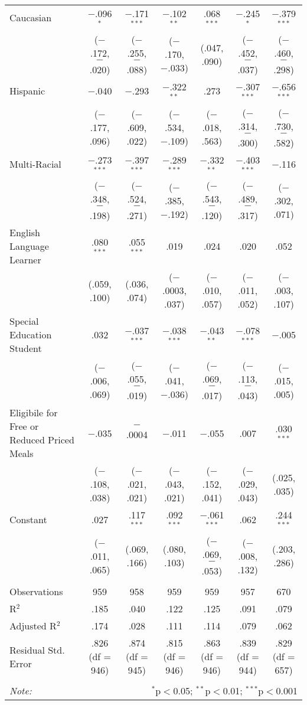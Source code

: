 \begin{table}[!htbp]
\begin{tabular}{@{\extracolsep{5pt}}lcccccc}
  Caucasian & $-$.096$^{*}$ & $-$.171$^{***}$ & $-$.102$^{**}$ & .068$^{***}$ & $-$.245$^{*}$ & $-$.379$^{***}$ \\ 
  & ($-$.172, $-$.020) & ($-$.255, $-$.088) & ($-$.170, $-$.033) & (.047, .090) & ($-$.452, $-$.037) & ($-$.460, $-$.298) \\ 
  Hispanic & $-$.040 & $-$.293 & $-$.322$^{**}$ & .273 & $-$.307$^{***}$ & $-$.656$^{***}$ \\ 
  & ($-$.177, .096) & ($-$.609, .022) & ($-$.534, $-$.109) & ($-$.018, .563) & ($-$.314, $-$.300) & ($-$.730, $-$.582) \\ 
  Multi-Racial & $-$.273$^{***}$ & $-$.397$^{***}$ & $-$.289$^{***}$ & $-$.332$^{**}$ & $-$.403$^{***}$ & $-$.116 \\ 
  & ($-$.348, $-$.198) & ($-$.524, $-$.271) & ($-$.385, $-$.192) & ($-$.543, $-$.120) & ($-$.489, $-$.317) & ($-$.302, .071) \\ 
  English Language Learner & .080$^{***}$ & .055$^{***}$ & .019 & .024 & .020 & .052 \\ 
  & (.059, .100) & (.036, .074) & ($-$.0003, .037) & ($-$.010, .057) & ($-$.011, .052) & ($-$.003, .107) \\ 
  Special Education Student & .032 & $-$.037$^{***}$ & $-$.038$^{***}$ & $-$.043$^{**}$ & $-$.078$^{***}$ & $-$.005 \\ 
  & ($-$.006, .069) & ($-$.055, $-$.019) & ($-$.041, $-$.036) & ($-$.069, $-$.017) & ($-$.113, $-$.043) & ($-$.015, .005) \\ 
  Eligibile for Free or Reduced Priced Meals & $-$.035 & $-$.0004 & $-$.011 & $-$.055 & .007 & .030$^{***}$ \\ 
  & ($-$.108, .038) & ($-$.021, .021) & ($-$.043, .021) & ($-$.152, .041) & ($-$.029, .043) & (.025, .035) \\ 
  Constant & .027 & .117$^{***}$ & .092$^{***}$ & $-$.061$^{***}$ & .062 & .244$^{***}$ \\ 
  & ($-$.011, .065) & (.069, .166) & (.080, .103) & ($-$.069, $-$.053) & ($-$.008, .132) & (.203, .286) \\ 
 \hline \\[-1.8ex] 
Observations & 959 & 958 & 959 & 959 & 957 & 670 \\ 
R$^{2}$ & .185 & .040 & .122 & .125 & .091 & .079 \\ 
Adjusted R$^{2}$ & .174 & .028 & .111 & .114 & .079 & .062 \\ 
Residual Std. Error & .826 (df = 946) & .874 (df = 945) & .815 (df = 946) & .863 (df = 946) & .839 (df = 944) & .829 (df = 657) \\ 
\hline \\[-1.8ex] 
\textit{Note:}  & \multicolumn{6}{r}{$^{*}$p$<$0.05; $^{**}$p$<$0.01; $^{***}$p$<$0.001} \\ 
\end{tabular} 
\end{table} 

